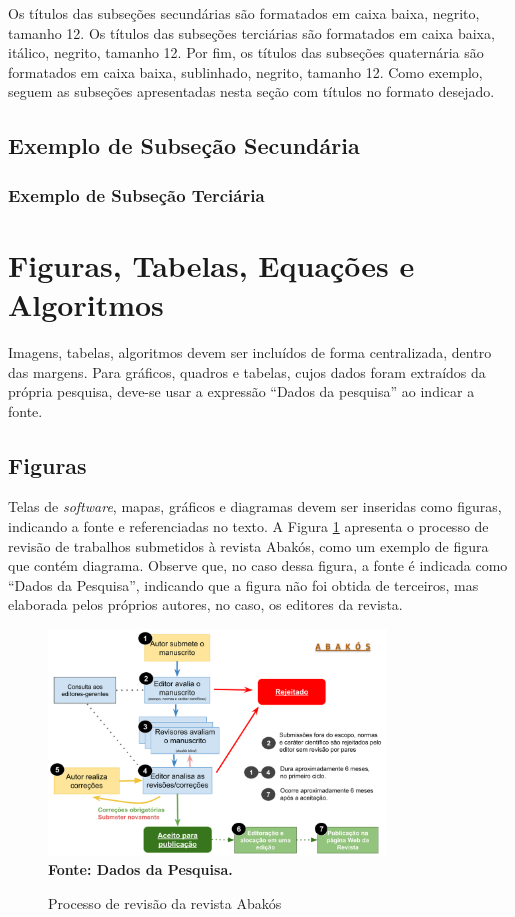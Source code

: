 \documentclass[a4paper,12pt]{article}
\begin{document}
Os títulos das subseções secundárias são formatados em caixa baixa, negrito, tamanho 12. Os títulos das subseções terciárias são formatados em caixa baixa, itálico, negrito, tamanho 12. Por fim, os títulos das subseções quaternária são formatados em caixa baixa, sublinhado, negrito, tamanho 12. Como exemplo, seguem as subseções apresentadas nesta seção com títulos no formato desejado.

\subsection{Exemplo de Subseção Secundária}
\subsubsection{Exemplo de Subseção Terciária}


\section{Figuras, Tabelas, Equações e Algoritmos}
\label{sec:figTabEqAlg}

Imagens, tabelas, algoritmos devem ser incluídos de forma centralizada, dentro das margens. Para gráficos, quadros e tabelas, cujos dados foram extraídos da própria pesquisa, deve-se  usar a expressão “Dados da pesquisa” ao indicar a fonte.

\subsection{Figuras}

Telas de \textit{software}, mapas, gráficos e diagramas devem ser inseridas como figuras, indicando a fonte e referenciadas no texto. A Figura \ref{fig:figura1} apresenta o processo de revisão de trabalhos submetidos à revista Abakós, como um exemplo de figura que contém diagrama. Observe que, no caso dessa figura, a fonte é indicada como ``Dados da Pesquisa'', indicando que a figura não foi obtida de terceiros, mas elaborada pelos próprios autores, no caso, os editores da revista.

\begin{figure}[htb]
	\centering	
	\caption[Processo de Revisão da Revista Abakós.]{Processo de revisão da revista Abakós}
	\label{fig:figura1}
	\includegraphics[width=0.8\textwidth]{figuras/Abakos-review.png}\\
	\textbf{\footnotesize Fonte: Dados da Pesquisa.}
\end{figure}
\end{document}
